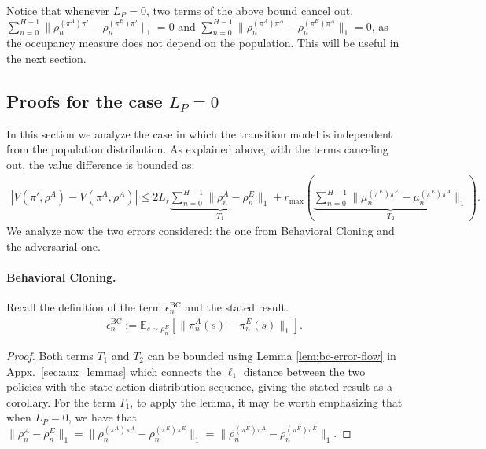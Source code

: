 \documentclass{article}
\begin{document}
Notice that whenever $L_P=0$, two terms of the above bound cancel out, $\sum_{n=0}^{H-1}\|\rho_n^{(\pi^A)\pi'}-\rho_n^{(\pi^E)\pi'}\|_1=0$ and $\sum_{n=0}^{H-1}\|\rho_n^{(\pi^A)\pi^A}-\rho_n^{(\pi^E)\pi^A}\|_1=0$, as the occupancy measure does not depend on the population. This will be useful in the next section.

\subsection{Proofs for the case $L_P=0$}
In this section we analyze the case in which the transition model is independent from the population distribution. As explained above, with the terms canceling out, the value difference is bounded as:
\begin{align}
    |V(\pi',\rho^A) - V(\pi^A,\rho^A)| 
    \leq
    2L_r\underbrace{\sum_{n=0}^{H-1}\|\rho^A_n - \rho^E_n\|_1}_{T_1} + r_{\max}(\underbrace{\sum_{n=0}^{H-1}\|\mu_n^{(\pi^E)\pi^E}-\mu_n^{(\pi^E)\pi^A}\|_1}_{T_2}).
\end{align}
We analyze now the two errors considered: the one from Behavioral Cloning and the adversarial one.

\paragraph{Behavioral Cloning.} 
Recall the definition of the term $\epsilon_n^\mathrm{BC}$ and the stated result.
\begin{align}
    \epsilon^{\mathrm{BC}}_n := \mathbb{E}_{s\sim \rho^E_n}\left[\| \pi^A_n(s) - \pi^E_n(s)\|_1\right].
\end{align}
\BCnotdep*
\begin{proof}
Both terms $T_1$ and $T_2$ can be bounded using Lemma \ref{lem:bc-error-flow} in Appx.~\ref{sec:aux_lemmas} which connects the $\ell_1$ distance between the two policies with the state-action distribution sequence, giving the stated result as a corollary. For the term $T_1$, to apply the lemma, it may be worth emphasizing that when $L_P=0$, we have that $\|\rho_n^A - \rho_n^E\|_1 = \|\rho_n^{(\pi^A)\pi^A} - \rho_n^{(\pi^E)\pi^E}\|_1 = \|\rho_n^{(\pi^E)\pi^A} - \rho_n^{(\pi^E)\pi^E}\|_1$.
\end{proof}
\end{document}
